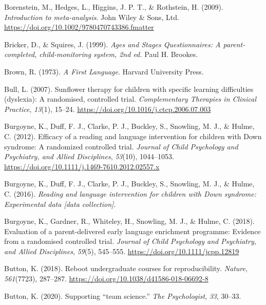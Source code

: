 \documentclass{krantz}
\newlength{\cslhangindent}
\newlength{\cslentryspacingunit} %
\newenvironment{CSLReferences}[2] %
{%
\setlength{\parindent}{0pt}
\ifodd #1
\let\oldpar\par
\def\par{\hangindent=\cslhangindent\oldpar}
\fi
\setlength{\parskip}{#2\cslentryspacingunit}
}%
{}
\begin{document}
\begin{CSLReferences}{1}{0}
\leavevmode{}%
Borenstein, M., Hedges, L., Higgins, J. P. T., \& Rothstein, H. (2009). \emph{Introduction to meta-analysis}. {John Wiley \& Sons, Ltd}. \url{https://doi.org/10.1002/9780470743386.fmatter}

\leavevmode{}%
Bricker, D., \& Squires, J. (1999). \emph{Ages and {Stages Questionnaires}: {A} parent-completed, child-monitoring system, 2nd ed.} {Paul H. Brookes}.

\leavevmode{}%
Brown, R. (1973). \emph{A {First Language}}. {Harvard University Press}.

\leavevmode{}%
Bull, L. (2007). Sunflower therapy for children with specific learning difficulties (dyslexia): A randomised, controlled trial. \emph{Complementary Therapies in Clinical Practice}, \emph{13}(1), 15--24. \url{https://doi.org/10.1016/j.ctcp.2006.07.003}

\leavevmode{}%
Burgoyne, K., Duff, F. J., Clarke, P. J., Buckley, S., Snowling, M. J., \& Hulme, C. (2012). Efficacy of a reading and language intervention for children with {Down} syndrome: A randomized controlled trial. \emph{Journal of Child Psychology and Psychiatry, and Allied Disciplines}, \emph{53}(10), 1044--1053. \url{https://doi.org/10.1111/j.1469-7610.2012.02557.x}

\leavevmode{}%
Burgoyne, K., Duff, F. J., Clarke, P. J., Buckley, S., Snowling, M. J., \& Hulme, C. (2016). \emph{Reading and language intervention for children with {Down} syndrome: {Experimental} data {[}data collection{]}}.

\leavevmode{}%
Burgoyne, K., Gardner, R., Whiteley, H., Snowling, M. J., \& Hulme, C. (2018). Evaluation of a parent-delivered early language enrichment programme: Evidence from a randomised controlled trial. \emph{Journal of Child Psychology and Psychiatry, and Allied Disciplines}, \emph{59}(5), 545--555. \url{https://doi.org/10.1111/jcpp.12819}

\leavevmode{}%
Button, K. (2018). Reboot undergraduate courses for reproducibility. \emph{Nature}, \emph{561}(7723), 287--287. \url{https://doi.org/10.1038/d41586-018-06692-8}

\leavevmode{}%
Button, K. (2020). Supporting {``team science.''} \emph{The Psychologist}, \emph{33}, 30--33.


\end{CSLReferences}
\end{document}
